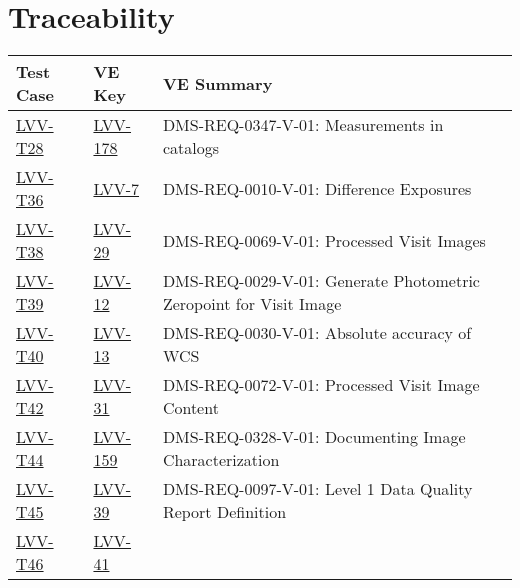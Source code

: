 \section{Traceability}

\begin{longtable}{p{3cm}p{3cm}L{9cm}}
\hline
\textbf{Test Case} & \textbf{VE Key} & \textbf{VE Summary} \\ \hline
\href{https://jira.lsstcorp.org/secure/Tests.jspa#/testCase/LVV-T28}{LVV-T28} &
  \href{https://jira.lsstcorp.org/browse/LVV-178}{LVV-178}
  & DMS-REQ-0347-V-01: Measurements in catalogs
 \\ 
\hline
\href{https://jira.lsstcorp.org/secure/Tests.jspa#/testCase/LVV-T36}{LVV-T36} &
  \href{https://jira.lsstcorp.org/browse/LVV-7}{LVV-7}
  & DMS-REQ-0010-V-01: Difference Exposures
 \\ 
\hline
\href{https://jira.lsstcorp.org/secure/Tests.jspa#/testCase/LVV-T38}{LVV-T38} &
  \href{https://jira.lsstcorp.org/browse/LVV-29}{LVV-29}
  & DMS-REQ-0069-V-01: Processed Visit Images
 \\ 
\hline
\href{https://jira.lsstcorp.org/secure/Tests.jspa#/testCase/LVV-T39}{LVV-T39} &
  \href{https://jira.lsstcorp.org/browse/LVV-12}{LVV-12}
  & DMS-REQ-0029-V-01: Generate Photometric Zeropoint for Visit Image
 \\ 
\hline
\href{https://jira.lsstcorp.org/secure/Tests.jspa#/testCase/LVV-T40}{LVV-T40} &
  \href{https://jira.lsstcorp.org/browse/LVV-13}{LVV-13}
  & DMS-REQ-0030-V-01: Absolute accuracy of WCS
 \\ 
\hline
\href{https://jira.lsstcorp.org/secure/Tests.jspa#/testCase/LVV-T42}{LVV-T42} &
  \href{https://jira.lsstcorp.org/browse/LVV-31}{LVV-31}
  & DMS-REQ-0072-V-01: Processed Visit Image Content
 \\ 
\hline
\href{https://jira.lsstcorp.org/secure/Tests.jspa#/testCase/LVV-T44}{LVV-T44} &
  \href{https://jira.lsstcorp.org/browse/LVV-159}{LVV-159}
  & DMS-REQ-0328-V-01: Documenting Image Characterization
 \\ 
\hline
\href{https://jira.lsstcorp.org/secure/Tests.jspa#/testCase/LVV-T45}{LVV-T45} &
  \href{https://jira.lsstcorp.org/browse/LVV-39}{LVV-39}
  & DMS-REQ-0097-V-01: Level 1 Data Quality Report Definition
 \\ 
\hline
\href{https://jira.lsstcorp.org/secure/Tests.jspa#/testCase/LVV-T46}{LVV-T46} &
  \href{https://jira.lsstcorp.org/browse/LVV-41}{LVV-41}

\end{longtable}
